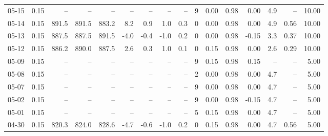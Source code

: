 \begin{threeparttable}
{\begin{tabular}{lrrrrrrrrrrrrrrr}
  05-15 &     0.15 &    -- &    -- &    -- &         -- &             -- &                       -- &                  -- &              9 &       0.00 &      0.98 &           0.00 &              4.9 &              -- &                  10.00 \\
  05-14 &     0.15 & 891.5 & 891.5 & 883.2 &        8.2 &            0.9 &                      1.0 &                 0.3 &              0 &       0.00 &      0.98 &           0.00 &              4.9 &            0.56 &                  10.00 \\
  05-13 &     0.15 & 887.5 & 887.5 & 891.5 &       -4.0 &           -0.4 &                     -1.0 &                 0.2 &              0 &       0.00 &      0.98 &          -0.15 &              3.3 &            0.37 &                  10.00 \\
  05-12 &     0.15 & 886.2 & 890.0 & 887.5 &        2.6 &            0.3 &                      1.0 &                 0.1 &              0 &       0.15 &      0.98 &           0.00 &              2.6 &            0.29 &                  10.00 \\
  05-09 &     0.15 &    -- &    -- &    -- &         -- &             -- &                       -- &                  -- &              9 &       0.15 &      0.98 &           0.15 &               -- &              -- &                   5.00 \\
  05-08 &     0.15 &    -- &    -- &    -- &         -- &             -- &                       -- &                  -- &              2 &       0.00 &      0.98 &           0.00 &              4.7 &              -- &                   5.00 \\
  05-07 &     0.15 &    -- &    -- &    -- &         -- &             -- &                       -- &                  -- &              9 &       0.00 &      0.98 &           0.00 &              4.7 &              -- &                   5.00 \\
  05-02 &     0.15 &    -- &    -- &    -- &         -- &             -- &                       -- &                  -- &              9 &       0.00 &      0.98 &          -0.15 &              4.7 &              -- &                   5.00 \\
  05-01 &     0.15 &    -- &    -- &    -- &         -- &             -- &                       -- &                  -- &              5 &       0.15 &      0.98 &           0.00 &              4.7 &              -- &                   5.00 \\
  04-30 &     0.15 & 820.3 & 824.0 & 828.6 &       -4.7 &           -0.6 &                     -1.0 &                 0.2 &              0 &       0.15 &      0.98 &           0.00 &              4.7 &            0.56 &                   5.00 \\

\end{tabular}}
\end{threeparttable}
